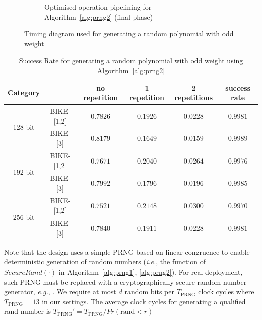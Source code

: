 \documentclass[runningheads]{llncs}
\begin{document}
\begin{figure}[!tb]
\begin{subfigure}[t]{0.45\textwidth}
\caption{Optimised operation pipelining for Algorithm~\ref{alg:prng2} (final phase) }
\label{fig:pipeline_rng3}
\end{subfigure}
\caption{Timing diagram used for generating a random polynomial with odd weight}
\end{figure}

\begin{table}[!tb]\centering
\caption{Success Rate for generating a random polynomial with odd weight using Algorithm~\ref{alg:prng2}}\label{table:success_rate}
\begin{tabular}{cc|cccc}
  \hline
 \textbf{Category}        &             & no repetition & 1 repetition & 2 repetitions & success rate \\\hline
\multirow{ 2}{*}{128-bit} &  BIKE-[1,2] & $0.7826$ & $0.1926$  & $0.0228$  & $0.9981$\\
                    &  BIKE-[3] & $0.8179$ & $0.1649$  & $0.0159$  & $0.9989$\\
  \hline
\multirow{ 2}{*}{192-bit} &  BIKE-[1,2] & $0.7671$ & $0.2040$  & $0.0264$  & $0.9976$\\
                    &  BIKE-[3] & $0.7992$ & $0.1796$  & $0.0196$  & $0.9985$\\
  \hline
\multirow{ 2}{*}{256-bit} &  BIKE-[1,2] & $0.7521$ & $0.2148$  & $0.0300$  & $0.9970$\\
                    &  BIKE-[3] & $0.7840$ & $0.1911$  & $0.0228$  & $0.9981$\\
  \hline
\end{tabular}
\end{table}




Note that the design uses a simple PRNG based on linear congruence to enable deterministic generation of random numbers (\textit{i.e.}, the function of $SecureRand(\cdot)$ in Algorithm~\ref{alg:prng1}, \ref{alg:prng2}). For real deployment,
such PRNG must be replaced with a cryptographically secure random number
generator, \textit{e.g.}, \cite{laue2007compact,cherkaoui2013very}. We require at most $d$ random bits per $T_{\text{PRNG}}$ clock cycles where $T_{\text{PRNG}}=13$ in our settings.
The average clock cycles for generating a qualified rand number is $T_{\text{PRNG}}' = T_{\text{PRNG}}/Pr(\text{rand} < r)$
\end{document}
